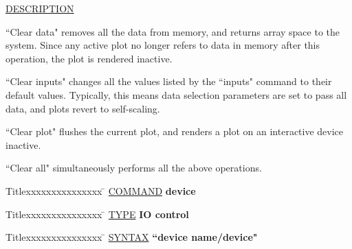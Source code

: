 \underline{DESCRIPTION}
\begin{list}{}{\setlength{\leftmargin}{0.5in}
     \setlength{\rightmargin}{0in}}
\item
``Clear data" removes all the data from memory, and returns
array space to the system.  Since any active plot no longer
refers to data in memory after this operation, the plot is
rendered inactive.
\item
``Clear inputs" changes all the values listed by the ``inputs"
command to their default values.  Typically, this means
data selection parameters are set to pass all data, and plots
revert to self-scaling.
\item
``Clear plot" flushes the current plot, and renders a plot on
an interactive device inactive.
\item
``Clear all" simultaneously performs all the above operations.
\end{list}
\vspace{.2in}

\begin{tabbing}
Titlexxxxxxxxxxxxxxx \= \kill
\underline{COMMAND} \> {\bf 	device} \\
\end{tabbing}

\begin{tabbing}
Titlexxxxxxxxxxxxxxx \= \kill
\underline{TYPE} \> {\bf 		IO control} \\
\end{tabbing}

\begin{tabbing}
Titlexxxxxxxxxxxxxxx \= \kill
\underline{SYNTAX} \> {\bf 		``device name/device"} \\
\end{tabbing}

